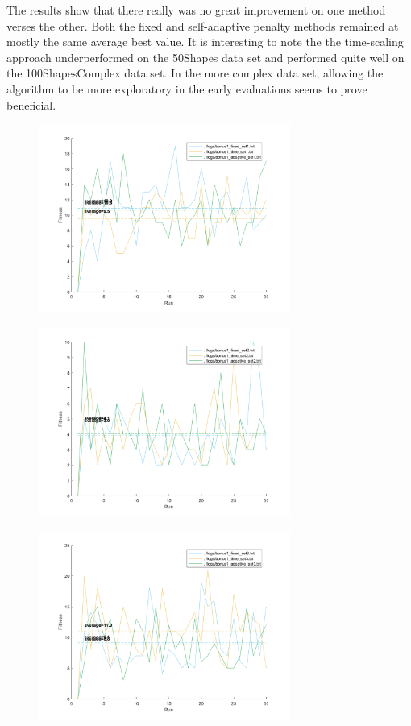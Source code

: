 \documentclass[11pt]{article}
\begin{document}
The results show that there really was no great improvement on one method verses the other. Both the fixed and self-adaptive penalty methods remained at mostly the same average best value. It is interesting to note the the time-scaling approach underperformed on the 50Shapes data set and performed quite well on the 100ShapesComplex data set. In the more complex data set, allowing the algorithm to be more exploratory in the early evaluations seems to prove beneficial.

\begin{figure}[h]
\begin{minipage}{.5\textwidth}
  \includegraphics[width=3.25in]{assn1c_bonus1_set1.png}
  \label{fig:bonus2_1}
\end{minipage}%
\begin{minipage}{.5\textwidth}
\centering
  \includegraphics[width=3.25in]{assn1c_bonus1_set2.png}
  \label{fig:bonus2_2}
\end{minipage}
\end{figure}
\begin{figure}[h]
	\centering
  \includegraphics[width=3.25in]{assn1c_bonus1_set3.png}
  \label{fig:bonus2_3}
\end{figure}
\end{document}
